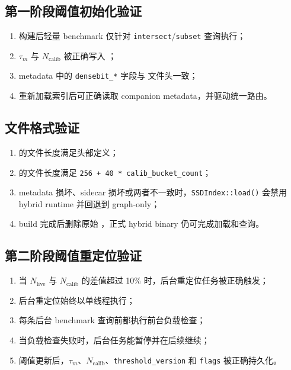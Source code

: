 \documentclass[UTF8]{ctexart}
\begin{document}
\subsection{第一阶段阈值初始化验证}
\begin{enumerate}
\item 构建后轻量 benchmark 仅针对 \texttt{intersect}/\texttt{subset} 查询执行；
\item \(\tau_m\) 与 \(N_{\text{calib}}\) 被正确写入 ；
\item metadata 中的 \texttt{densebit\_*} 字段与  文件头一致；
\item 重新加载索引后可正确读取 companion metadata，并驱动统一路由。
\end{enumerate}

\subsection{文件格式验证}
\begin{enumerate}
\item {} 的文件长度满足头部定义；
\item {} 的文件长度满足 \texttt{256 + 40 * calib\_bucket\_count}；
\item metadata 损坏、sidecar 损坏或两者不一致时，\texttt{SSDIndex::load()} 会禁用 hybrid runtime 并回退到 graph-only；
\item build 完成后删除原始 ，正式 hybrid binary 仍可完成加载和查询。
\end{enumerate}

\subsection{第二阶段阈值重定位验证}
\begin{enumerate}
\item 当 \(N_{\text{live}}\) 与 \(N_{\text{calib}}\) 的差值超过 10\% 时，后台重定位任务被正确触发；
\item 后台重定位始终以单线程执行；
\item 每条后台 benchmark 查询前都执行前台负载检查；
\item 当负载检查失败时，后台任务能暂停并在后续继续；
\item 阈值更新后，\(\tau_m\)、\(N_{\text{calib}}\)、\texttt{threshold\_version} 和 \texttt{flags} 被正确持久化。
\end{enumerate}
\end{document}
